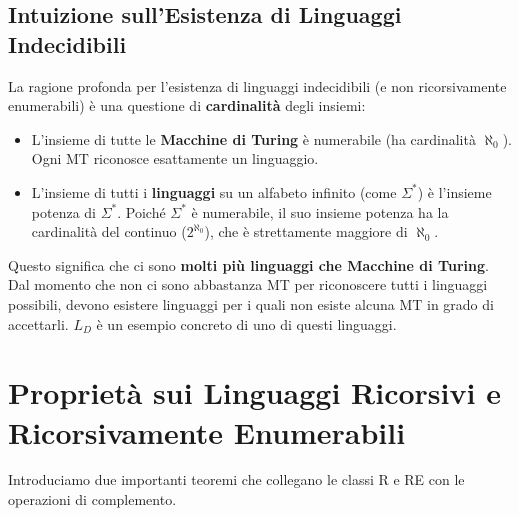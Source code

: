 \documentclass[a4paper]{article}
\begin{document}
\subsection{Intuizione sull'Esistenza di Linguaggi Indecidibili}

La ragione profonda per l'esistenza di linguaggi indecidibili (e non ricorsivamente enumerabili) è una questione di \textbf{cardinalità} degli insiemi:
\begin{itemize}
    \item L'insieme di tutte le \textbf{Macchine di Turing} è numerabile (ha cardinalità $\aleph_0$). Ogni MT riconosce esattamente un linguaggio.
    \item L'insieme di tutti i \textbf{linguaggi} su un alfabeto infinito (come $\Sigma^*$) è l'insieme potenza di $\Sigma^*$. Poiché $\Sigma^*$ è numerabile, il suo insieme potenza ha la cardinalità del continuo ($2^{\aleph_0}$), che è strettamente maggiore di $\aleph_0$.
\end{itemize}
Questo significa che ci sono \textbf{molti più linguaggi che Macchine di Turing}. Dal momento che non ci sono abbastanza MT per riconoscere tutti i linguaggi possibili, devono esistere linguaggi per i quali non esiste alcuna MT in grado di accettarli. $L_D$ è un esempio concreto di uno di questi linguaggi.

\section{Proprietà sui Linguaggi Ricorsivi e Ricorsivamente Enumerabili}

Introduciamo due importanti teoremi che collegano le classi R e RE con le operazioni di complemento.
\end{document}

